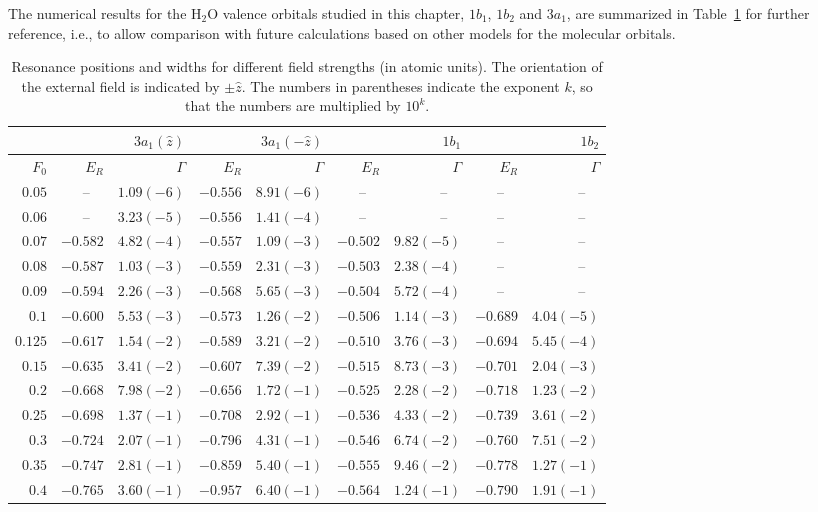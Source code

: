 The numerical results for the H$_{2}$O valence orbitals studied in
this chapter, $1b_{1}$, $1b_{2}$ and $3a_{1}$, are summarized in
Table~\ref{tab:3a1_results} for further reference, i.e., to allow
comparison with future calculations based on other models for the
molecular orbitals.


\begin{table}[t]
\centering
\caption{\label{tab:3a1_results} Resonance positions and widths for
  different field strengths (in atomic units). The orientation of the
  external field is indicated by $\pm\hat{z}$. The numbers in
  parentheses indicate the exponent $k$, so that the numbers are
  multiplied by $10^{k}$.}
\begin{tabular}{rrrrrrrrr}
\toprule
&& $3a_{1}(\hat{z})$ && $3a_{1}(-\hat{z})$ && $1b_{1}$ && $1b_{2}$ \\
\midrule
$F_{0}$&$E_{R}$&$\Gamma$&$E_{R}$&$\Gamma$&$E_{R}$&$\Gamma$&$E_{R}$&$\Gamma$ \\
\midrule
$0.05$ &   --~~ &$1.09(-6)$&$-0.556$&$8.91(-6)$ & --~~ & --~~ & --~~ & --~~ \\
$0.06$ &   --~~ &$3.23(-5)$&$-0.556$&$1.41(-4)$ & --~~ & --~~ & --~~ & --~~ \\
$0.07$ &$-0.582$&$4.82(-4)$&$-0.557$&$1.09(-3)$&$-0.502$&$9.82(-5)$ & --~~ & --~~ \\
$0.08$ &$-0.587$&$1.03(-3)$&$-0.559$&$2.31(-3)$&$-0.503$&$2.38(-4)$ & --~~ & --~~ \\
$0.09$ &$-0.594$&$2.26(-3)$&$-0.568$&$5.65(-3)$&$-0.504$&$5.72(-4)$ & --~~ & --~~ \\
$0.1$  &$-0.600$&$5.53(-3)$&$-0.573$&$1.26(-2)$&$-0.506$&$1.14(-3)$&$-0.689$&$4.04(-5)$\\
$0.125$&$-0.617$&$1.54(-2)$&$-0.589$&$3.21(-2)$&$-0.510$&$3.76(-3)$&$-0.694$&$5.45(-4)$\\
$0.15$ &$-0.635$&$3.41(-2)$&$-0.607$&$7.39(-2)$&$-0.515$&$8.73(-3)$&$-0.701$&$2.04(-3)$\\
$0.2$  &$-0.668$&$7.98(-2)$&$-0.656$&$1.72(-1)$&$-0.525$&$2.28(-2)$&$-0.718$&$1.23(-2)$\\
$0.25$ &$-0.698$&$1.37(-1)$&$-0.708$&$2.92(-1)$&$-0.536$&$4.33(-2)$&$-0.739$&$3.61(-2)$\\
$0.3$  &$-0.724$&$2.07(-1)$&$-0.796$&$4.31(-1)$&$-0.546$&$6.74(-2)$&$-0.760$&$7.51(-2)$\\
$0.35$ &$-0.747$&$2.81(-1)$&$-0.859$&$5.40(-1)$&$-0.555$&$9.46(-2)$&$-0.778$&$1.27(-1)$\\
$0.4$  &$-0.765$&$3.60(-1)$&$-0.957$&$6.40(-1)$&$-0.564$&$1.24(-1)$&$-0.790$&$1.91(-1)$\\
\bottomrule
\end{tabular}
\end{table}



